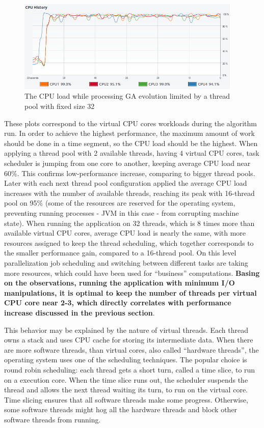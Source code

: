 \begin{figure}[H]
\centering\includegraphics[width=0.95\textwidth]{img/exp/2/limit-threadpool-32}
\caption{The CPU load while processing GA evolution limited by a thread pool with fixed size 32 }  \label{img:cpu-thread-32}
\end{figure}

These plots correspond to the virtual CPU cores workloads during the algorithm run. In order to achieve the highest performance, the maximum amount of work should be done in a time segment, so the CPU load should be the highest. When applying a  thread pool with 2 available threads, having 4 virtual CPU cores, task scheduler is jumping from one core to another, keeping average CPU load near 60\%. This confirms low-performance increase, comparing to bigger thread pools. Later with each next thread pool configuration applied the average CPU load increases with the number of available threads, reaching its peak with 16-thread pool on 95\% (some of the resources are reserved for the operating system, preventing running processes - JVM in this case - from corrupting machine state). When running the application on 32 threads, which is 8 times more than available virtual CPU cores, average CPU load is nearly the same, with more resources assigned to keep the thread scheduling, which together corresponds to the smaller performance gain, compared to a 16-thread pool. On this level parallelization job scheduling and switching between different tasks are taking more resources, which could have been used for ``business'' computations. \textbf{Basing on the observations, running the application with minimum I/O manipulations, it is optimal to keep the number of threads per virtual CPU core near 2-3, which directly correlates with performance increase discussed in the previous section}.

This behavior may be explained by the nature of virtual threads. Each thread owns a stack and uses CPU cache for storing its intermediate data. When there are more software threads, than virtual cores, also called ``hardware threads'', the operating system uses one of the scheduling techniques. The popular choice is round robin scheduling: each thread gets a short turn, called a time slice, to run on a execution core. When the time slice runs out, the scheduler suspends the thread and allows the next thread waiting its turn, to run on the virtual core. Time slicing ensures that all software threads make some progress. Otherwise, some software threads might hog all the hardware threads and block other software threads from running.

